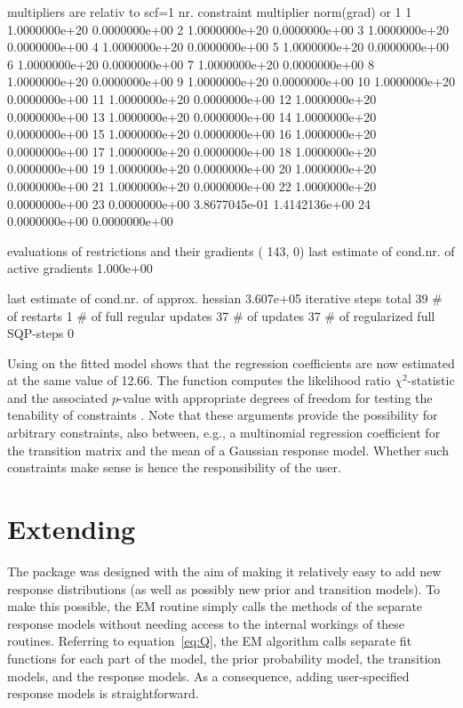\documentclass[article]{jss}
\begin{document}
\begin{Schunk}
\begin{Soutput}
  multipliers are relativ to scf=1
  nr.    constraint     multiplier norm(grad) or 1 
    1   1.0000000e+20    0.0000000e+00 
    2   1.0000000e+20    0.0000000e+00 
    3   1.0000000e+20    0.0000000e+00 
    4   1.0000000e+20    0.0000000e+00 
    5   1.0000000e+20    0.0000000e+00 
    6   1.0000000e+20    0.0000000e+00 
    7   1.0000000e+20    0.0000000e+00 
    8   1.0000000e+20    0.0000000e+00 
    9   1.0000000e+20    0.0000000e+00 
   10   1.0000000e+20    0.0000000e+00 
   11   1.0000000e+20    0.0000000e+00 
   12   1.0000000e+20    0.0000000e+00 
   13   1.0000000e+20    0.0000000e+00 
   14   1.0000000e+20    0.0000000e+00 
   15   1.0000000e+20    0.0000000e+00 
   16   1.0000000e+20    0.0000000e+00 
   17   1.0000000e+20    0.0000000e+00 
   18   1.0000000e+20    0.0000000e+00 
   19   1.0000000e+20    0.0000000e+00 
   20   1.0000000e+20    0.0000000e+00 
   21   1.0000000e+20    0.0000000e+00 
   22   1.0000000e+20    0.0000000e+00 
   23   0.0000000e+00    3.8677045e-01    1.4142136e+00
   24   0.0000000e+00    0.0000000e+00 

 evaluations of restrictions and their gradients
 (   143,     0)
 last estimate of cond.nr. of active gradients   1.000e+00

 last estimate of cond.nr. of approx.  hessian   3.607e+05
iterative steps total              39
# of restarts                       1
# of full regular updates          37
# of updates                       37
# of regularized full SQP-steps     0
\end{Soutput}
\end{Schunk}

Using  on the fitted model shows that the regression 
coefficients are now estimated at the same value of 12.66. The function
 computes the likelihood ratio $\chi^2$-statistic and the
associated $p$-value with appropriate degrees of freedom for testing the
tenability of constraints \citep{Dannemann2007}. Note that these arguments 
provide the possibility for arbitrary 
constraints, also between, e.g., a multinomial regression coefficient 
for the transition matrix and the mean of a Gaussian response model. 
Whether such constraints make sense is hence the responsibility of 
the user. 

\section[Extending depmixS4]{Extending }

The  package was designed with the aim of making it
relatively easy to add new response distributions (as well as possibly
new prior and transition models).  To make this possible, the EM
routine simply calls the  methods of the separate response
models without needing access to the internal workings of these
routines.  Referring to equation~\ref{eq:Q}, the EM algorithm calls
separate fit functions for each part of the model, the prior
probability model, the transition models, and the response models.  As
a consequence, adding user-specified response models is
straightforward.
\end{document}
